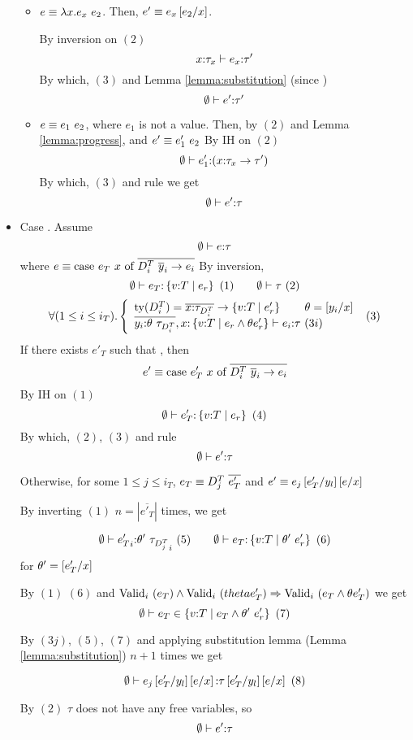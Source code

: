 \begin{itemize}
\begin{itemize}
\item $e \equiv \eapp{\efun{x}{e_x}}{e_2}$.
Then, $e' \equiv e_x\sub{x}{e_2}$.

By inversion on $(2)$
$$
	\hastype{x\colon\tau_x}{e_x}{\tau'}
$$
By which, $(3)$ and Lemma \ref{lemma:substitution} (since )
$$\hastype{\emptyset}{e'}{\tau'}$$

\item $e \equiv \eapp{e_1}{e_2}$, where $e_1$ is not a value.
Then, by $(2)$ and Lemma \ref{lemma:progress},  and 
$e'\equiv\eapp{e_1'}{e_2}$
By IH on $(2)$
$$	\hastype{\emptyset}{e_1'}{(\tfun{x}{\tau_{x}}{\tau'})}
$$
By which, $(3)$ and rule \rtapp we get
$$	\hastype{\emptyset}{e'}{\tau}$$
\end{itemize}

\item Case \rtcase.
Assume 
$$
	\hastype{\emptyset}{e}{\tau}
$$
where $e \equiv \ecase{e_T}{x}{\dcti}{\overline{y}_i}{e_i}$
By inversion,
$$
	\hastype{\emptyset}{e_T}{\tref{v}{T}{e_r}}\ (1)\qquad \iswellformed{\emptyset}{\tau}\ (2)
$$
$$
	\tforalli{T}. \left\lbrace
	\begin{array}{ll}
 	\ty{\dcti} = \overline{x\colon\tau_{\dcti}}\rightarrow \tref{v}{T}{e'_r} \qquad
 	\theta = \sub{x}{y_i} \cr
	\hastype{\overline{y_i\colon\theta\ \tau_{\dcti}}, 
				x\colon \tref{v}{T}{e_r \land \theta e'_r}
				}{e_i}{\tau}\ (3i)
	\end{array} \right. \ (3)
$$
If there exists $e'_T$ such that , then
$$e'\equiv\ecase{e'_T}{x}{\dcti}{\overline{y}_i}{e_i}$$
By IH on $(1)$
$$
	\hastype{\emptyset}{e'_T}{\tref{v}{T}{e_r}}\ (4)
$$
By which, $(2)$, $(3)$ and rule \rtcase
$$\hastype{\emptyset}{e'}{\tau}$$

Otherwise, for some $1 \leq j \leq i_T$, $e_T\equiv \dct{j}\ \overline{e'_T}$ 
and $e' \equiv e_j\sub{y_l}{e'_T}\sub{x}{e}$

By inverting $(1)$ $n = | \overline{e'_T}|$ times, we get

$$
	\hastype{\emptyset}{{e'_T}_i}{\theta'\ {\tau_{\dct{j}}}_i}\ (5) \qquad
	\hastype{\emptyset}{e_T}{\tref{v}{T}{\theta'\ e'_r}} \ (6)
$$
for $\theta' = \sub{x}{e'_T}$

By $(1)$ $(6)$ and 
$\validi{e_T} \land \validi{theta e'_T} \Rightarrow \validi{e_T \land \theta e'_T}$
we get 
$$
	\shastype{\emptyset}{e_T}{\tref{v}{T}{e_T \land \theta'\ e'_r}}\ (7)
$$

By $(3j)$, $(5)$, $(7)$ and applying substitution lemma (Lemma \ref{lemma:substitution})
$n+1$ times we get

$$\hastype{\emptyset}{e_j\sub{y_l}{e'_T}\sub{x}{e}}{\tau\sub{y_l}{e'_T}\sub{x}{e}}\ (8)$$

By $(2)$ $\tau$ does not have any free variables, so
$$\hastype{\emptyset}{e'}{\tau}$$

\end{itemize}